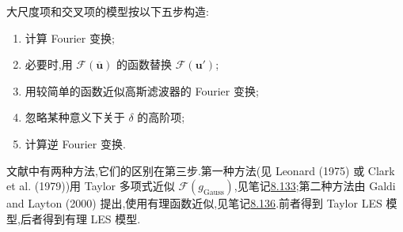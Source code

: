 \begin{note}[基本方法]
\label{note:les-wave-number-principal-approach}
大尺度项和交叉项的模型按以下五步构造:
\begin{enumerate}
 \item 计算 Fourier 变换;
 \item 必要时,用 $\mathcal{F}(\overline{\bm{u}})$ 的函数替换 $\mathcal{F}(\bm{u}')$;
 \item 用较简单的函数近似高斯滤波器的 Fourier 变换;
 \item 忽略某种意义下关于 $\delta$ 的高阶项;
 \item 计算逆 Fourier 变换.
\end{enumerate}
文献中有两种方法,它们的区别在第三步.第一种方法(见 Leonard (1975) 或 Clark et al. (1979))用 Taylor 多项式近似 $\mathcal{F}(g_{\mathrm{Gauss}})$,见笔记\hyperref[note:les-taylor-polynomial-approximation]{8.133};第二种方法由 Galdi and Layton (2000) 提出,使用有理函数近似,见笔记\hyperref[note:les-rational-approximation]{8.136}.前者得到 Taylor LES 模型,后者得到有理 LES 模型.
\end{note}

